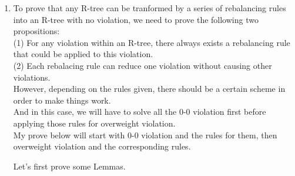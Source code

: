 \documentclass[10pt]{article}
\begin{document}
\begin{enumerate}
\begin{proof}
\begin{addmargin}[1em]{0em}
        \textit{Rule 8:}
        \begin{addmargin}[1em]{0em}
		\end{addmargin}

	\end{addmargin}
	
	\end{proof}

	\item
	To prove that any R-tree can be tranformed by a series of rebalancing rules into an R-tree with no violation, we need to prove the following two propositions: \\
	(1) For any violation within an R-tree, there always exists a rebalancing rule that could be applied to this violation. \\
	(2) Each rebalacing rule can reduce one violation without causing other violations. \\
	However, depending on the rules given, there should be a certain scheme in
	order to make things work. \\
	And in this case, we will have to solve all the 0-0 violation first before
	applying those rules for overweight violation. \\
	My prove below will start with 0-0 violation and the rules for them, then
	overweight violation and the corresponding rules. 

	Let's first prove some Lemmas.


\end{enumerate}
\end{document}
